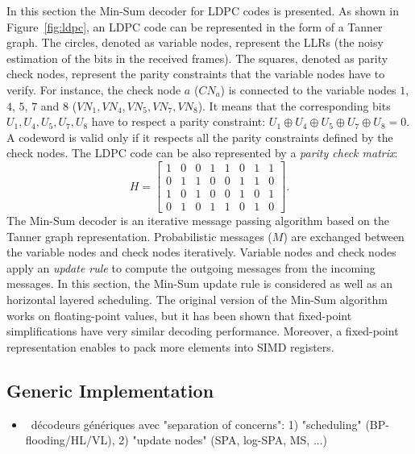 In this section the Min-Sum decoder for LDPC codes is presented. As shown in
Figure~\ref{fig:ldpc}, an LDPC code can be represented in the form of a Tanner
graph. The circles, denoted as variable nodes, represent the LLRs (the noisy
estimation of the bits in the received frames). The squares, denoted as parity
check nodes, represent the parity constraints that the variable nodes have to
verify. For instance, the check node $a$ ($CN_a$) is connected to the variable
nodes $1$, $4$, $5$, $7$ and $8$ ($VN_1, VN_4, VN_5, VN_7, VN_8$). It means that
the corresponding bits $U_1, U_4, U_5, U_7, U_8$ have to respect a parity
constraint: $U_1 \oplus U_4 \oplus U_5 \oplus U_7 \oplus U_8 = 0$. A codeword is
valid only if it respects all the parity constraints defined by the check nodes.
The LDPC code can be also represented by a \textit{parity check matrix}:
{ \begin{equation*}
H =
\begin{bmatrix}
  1&0&0&1&1&0&1&1\\
  0&1&1&0&0&1&1&0\\
  1&0&1&0&0&1&0&1\\
  0&1&0&1&1&0&1&0
\end{bmatrix}.
\end{equation*}
}
The Min-Sum decoder is an iterative message passing algorithm based on the
Tanner graph representation. Probabilistic messages ($M$) are exchanged between
the variable nodes and check nodes iteratively. Variable nodes and check nodes
apply an \textit{update rule} to compute the outgoing messages from the incoming
messages. In this section, the Min-Sum update rule is considered as well as an
horizontal layered scheduling. The original version of the Min-Sum algorithm
works on floating-point values, but it has been shown that fixed-point
simplifications have very similar decoding performance. Moreover, a fixed-point
representation enables to pack more elements into SIMD registers.

\subsection{Generic Implementation}

\begin{itemize}
  \item \xmark~décodeurs génériques avec "separation of concerns":
    1) "scheduling" (BP-flooding/HL/VL), 2) "update nodes" (SPA, log-SPA, MS,
    ...)
\end{itemize}

